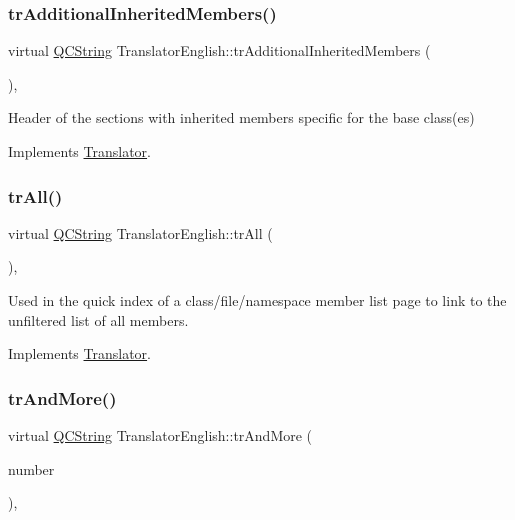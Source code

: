 \subsubsection{\texorpdfstring{trAdditionalInheritedMembers()}{trAdditionalInheritedMembers()}}
{\footnotesize\ttfamily virtual \mbox{\hyperlink{class_q_c_string}{Q\+C\+String}} Translator\+English\+::tr\+Additional\+Inherited\+Members (\begin{DoxyParamCaption}{ }\end{DoxyParamCaption})\hspace{0.3cm}{\ttfamily [inline]}, {\ttfamily [virtual]}}

Header of the sections with inherited members specific for the base class(es) 

Implements \mbox{\hyperlink{class_translator}{Translator}}.

\mbox{\label{class_translator_english_a51469d180bdb05fa28562fd2a1c86c55}} 
\subsubsection{\texorpdfstring{trAll()}{trAll()}}
{\footnotesize\ttfamily virtual \mbox{\hyperlink{class_q_c_string}{Q\+C\+String}} Translator\+English\+::tr\+All (\begin{DoxyParamCaption}{ }\end{DoxyParamCaption})\hspace{0.3cm}{\ttfamily [inline]}, {\ttfamily [virtual]}}

Used in the quick index of a class/file/namespace member list page to link to the unfiltered list of all members. 

Implements \mbox{\hyperlink{class_translator}{Translator}}.

\mbox{\label{class_translator_english_ad32635bab1929742206e3db9ccb5c326}} 
\subsubsection{\texorpdfstring{trAndMore()}{trAndMore()}}
{\footnotesize\ttfamily virtual \mbox{\hyperlink{class_q_c_string}{Q\+C\+String}} Translator\+English\+::tr\+And\+More (\begin{DoxyParamCaption}\item[{const \mbox{\hyperlink{class_q_c_string}{Q\+C\+String}} \&}]{number }\end{DoxyParamCaption})\hspace{0.3cm}{\ttfamily [inline]}, {\ttfamily [virtual]}}

